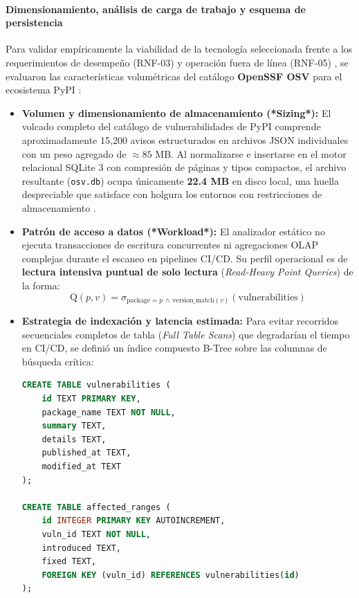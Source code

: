 \paragraph*{Dimensionamiento, análisis de carga de trabajo y esquema de persistencia}
Para validar empíricamente la viabilidad de la tecnología seleccionada frente a los requerimientos de desempeño (RNF-03) y operación fuera de línea (RNF-05) \cite{torres2026proyecto}, se evaluaron las características volumétricas del catálogo \textbf{OpenSSF OSV} para el ecosistema PyPI \cite{openssf2023osv}:

\begin{itemize}
    \item \textbf{Volumen y dimensionamiento de almacenamiento (*Sizing*):} El volcado completo del catálogo de vulnerabilidades de PyPI comprende aproximadamente 15,200 avisos estructurados en archivos JSON individuales con un peso agregado de $\approx 85\text{ MB}$. Al normalizarse e insertarse en el motor relacional SQLite 3 con compresión de páginas y tipos compactos, el archivo resultante (\texttt{osv.\allowbreak db}) ocupa únicamente \textbf{22.4 MB} en disco local, una huella despreciable que satisface con holgura los entornos con restricciones de almacenamiento \cite{ladisa2023sok}.
    \item \textbf{Patrón de acceso a datos (*Workload*):} El analizador estático no ejecuta transacciones de escritura concurrentes ni agregaciones OLAP complejas durante el escaneo en pipelines CI/CD. Su perfil operacional es de \textbf{lectura intensiva puntual de solo lectura} (\textit{Read-Heavy Point Queries}) de la forma:
    $$\text{Q}(p, v) = \sigma_{\text{package}=p \,\land\, \text{version\_match}(v)}(\text{vulnerabilities})$$
    \item \textbf{Estrategia de indexación y latencia estimada:} Para evitar recorridos secuenciales completos de tabla (\textit{Full Table Scans}) que degradarían el tiempo en CI/CD, se definió un índice compuesto B-Tree sobre las columnas de búsqueda crítica:
    \begin{lstlisting}[language=SQL, caption={Definición del esquema e índices locales para OSV}, label={lst:schema_sqlite}]
CREATE TABLE vulnerabilities (
    id TEXT PRIMARY KEY,
    package_name TEXT NOT NULL,
    summary TEXT,
    details TEXT,
    published_at TEXT,
    modified_at TEXT
);

CREATE TABLE affected_ranges (
    id INTEGER PRIMARY KEY AUTOINCREMENT,
    vuln_id TEXT NOT NULL,
    introduced TEXT,
    fixed TEXT,
    FOREIGN KEY (vuln_id) REFERENCES vulnerabilities(id)
);


\end{lstlisting}
\end{itemize}
